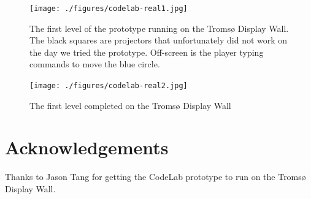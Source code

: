 \documentclass[12pt,journal,compsoc, a4paper, onecolumn]{IEEEtran}
\begin{document}
\begin{figure}[htb]
    \begin{centering}
    \texttt{[image: ./figures/codelab-real1.jpg]}
    \caption{The first level of the prototype running on the Tromsø Display
    Wall. The black squares are projectors that unfortunately did not work on
the day we tried the prototype. Off-screen is the player typing commands to move
the blue circle. } 
    \label{fig:real1}
    \end{centering} 
\end{figure}

\begin{figure}[htb]
    \begin{centering}
    \texttt{[image: ./figures/codelab-real2.jpg]}
    \caption{The first level completed on the Tromsø Display Wall} 
    \label{fig:real2}
    \end{centering} 
\end{figure}

\section{Acknowledgements}
Thanks to Jason Tang for getting the CodeLab prototype to run on the Troms{\o}
Display Wall. 

{}

\end{document}
